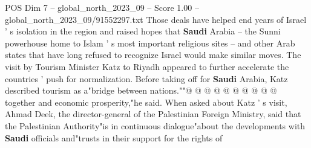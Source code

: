 \begin{textsample}{POS Dim 7 – global\_north\_2023\_09 – Score 1.00 – global\_north\_2023\_09/91552297.txt}
Those deals have helped end years of Israel ' s isolation in the region and raised hopes that \textbf{Saudi} Arabia -- the Sunni powerhouse home to Islam ' s most important religious sites -- and other Arab states that have long refused to recognize Israel would make similar moves.
The visit by Tourism Minister Katz to Riyadh appeared to further accelerate the countries ' push for normalization.
Before taking off for \textbf{Saudi} Arabia, Katz described tourism as a"bridge between nations.""@ @ @ @ @ @ @ @ @ @ together and economic prosperity,"he said.
When asked about Katz ' s visit, Ahmad Deek, the director-general of the Palestinian Foreign Ministry, said that the Palestinian Authority"is in continuous dialogue"about the developments with \textbf{Saudi} officials and"trusts in their support for the rights of

\end{textsample}
